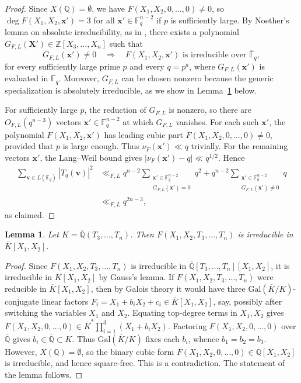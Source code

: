 \documentclass[a4paper,11pt, twoside,reqno]{amsart}
\theoremstyle{plain}
\newtheorem{lemma}[thm]{Lemma}
\theoremstyle{definition}
\theoremstyle{remark}
\newcommand{\Gal}{\mathrm{Gal}}
\newcommand{\bfv}{\bm{v}}
\newcommand{\bfx}{\bm{x}}
\newcommand{\QQ}{\mathbb{Q}}
\DeclareMathOperator{\G}{Gal}
\renewcommand{\bar}{\overline}
\newcommand{\FF}{\mathbb{F}}
\newcommand{\Qbar}{\overline{\mathbb{Q}}}
\numberwithin{equation}{section}
\begin{document}
\begin{proof}
Since $X(\QQ)=\emptyset$, we have $F(X_1,X_2,0,\dots,0) \ne 0$,
so $\deg F(X_1,X_2,\bfx') = 3$ for all $\bfx'\in\FF_q^{n-2}$
if $p$ is sufficiently large.
By Noether's lemma on absolute irreducibility, as in \cite[Ch.~V, Thm.~2A]{Sch76}, there exists a polynomial
$G_{F,L}(\mathbf{X}')\in\mathbb{Z}[X_3,\ldots,X_n]$ such that
\[
G_{F,L}(\bfx')\neq0
\quad\Longrightarrow\quad
F(X_1,X_2,\bfx')\text{ is irreducible over }\bar{\FF}_q,
\]
for every sufficiently large prime $p$ and every $q=p^a$, where $G_{F,L}(\bfx')$ is evaluated in $\FF_q$.
Moreover, $G_{F,L}$ can be chosen nonzero because the
generic specialization is absolutely irreducible,
as we show in Lemma~\ref{generic-irred} below.

For sufficiently large $p$, the reduction of $G_{F,L}$ is nonzero, so there are $O_{F,L}(q^{n-3})$ vectors $\bfx'\in\FF_q^{n-2}$ at which $G_{F,L}$ vanishes.
For each such $\bfx'$, the polynomial $F(X_1,X_2,\bfx')$
has leading cubic part $F(X_1,X_2,0,\dots,0) \ne 0$,
provided that $p$ is large enough.
Thus $\nu_F(\bfx')\ll q$ trivially.
For the remaining vectors $\bfx'$, the Lang--Weil bound gives $|\nu_F(\bfx')-q|\ll q^{1/2}$.
Hence
\[
\begin{aligned}
\sum_{\bfv\in L(\FF_q)}|T_q(\bfv)|^2
&\ll_{F,L}
q^{n-2} \sum_{\substack{\bfx'\in\FF_q^{n-2}\\G_{F,L}(\bfx')=0}} q^2
+ q^{n-2} \sum_{\substack{\bfx'\in\FF_q^{n-2}\\G_{F,L}(\bfx')\neq0}} q \\
&\ll_{F,L}q^{2n-3},
\end{aligned}
\]
as claimed.
\end{proof}

\begin{lemma}
\label{generic-irred}
Let $K=\Qbar(T_3,\ldots,T_n)$.
Then $F(X_1,X_2,T_3,\dots,T_n)$ is irreducible in $\bar{K}[X_1,X_2]$.
\end{lemma}

\begin{proof}
Since $F(X_1,X_2,T_3,\dots,T_n)$ is irreducible in $\Qbar[T_3,\dots,T_n][X_1,X_2]$,
it is irreducible in $K[X_1,X_2]$ by Gauss's lemma.
If $F(X_1,X_2,T_3,\dots,T_n)$ were reducible in $\bar{K}[X_1,X_2]$,
then by Galois theory it would have three $\Gal(\bar{K}/K)$-conjugate linear factors
$F_i = X_1+b_iX_2+c_i\in \bar{K}[X_1,X_2]$, say,
possibly after switching the variables $X_1$ and $X_2$.
Equating top-degree terms in $X_1,X_2$ gives
$F(X_1,X_2,0,\dots,0)
\in \bar{K}^\ast \prod_{i=1}^{3} (X_1+b_iX_2)$.
Factoring $F(X_1,X_2,0,\dots,0)$ over $\Qbar$
gives $b_i\in \Qbar\subset K$.
Thus $\Gal(\bar{K}/K)$ fixes each $b_i$, whence $b_1=b_2=b_3$.
However, $X(\QQ) = \emptyset$, so the binary cubic form
$F(X_1,X_2,0,\dots,0) \in \QQ[X_1,X_2]$
is irreducible, and hence square-free.
This is a contradiction.
The statement of the lemma follows.
\end{proof}
\end{document}
